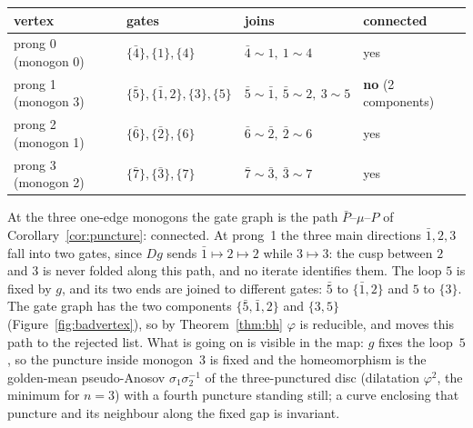 \documentclass[12pt]{amsart}
\newcommand{\anti}[1]{\bar{#1}}          %
\newcommand{\ho}{\varphi}                 %
\newcommand{\Dg}{D}                       %
\newcommand{\per}{P}                      %
\newcommand{\np}{n}                       %
\newcommand{\set}[1]{\{#1\}}
\theoremstyle{plain}
\theoremstyle{definition}
\begin{document}
\begin{center}
  \small
  \begin{tabular}{@{}llll@{}}
    \toprule
    vertex & gates & joins & connected \\
    \midrule
    prong 0 (monogon 0) & $\set{\anti4},\set{1},\set{4}$ & $\anti4\!\sim\!1,\ 1\!\sim\!4$ & yes \\
    prong 1 (monogon 3) & $\set{\anti5},\set{\anti1,2},\set{3},\set{5}$
       & $\anti5\!\sim\!\anti1,\ \anti5\!\sim\!2,\ 3\!\sim\!5$ & \textbf{no} (2 components) \\
    prong 2 (monogon 1) & $\set{\anti6},\set{\anti2},\set{6}$ & $\anti6\!\sim\!\anti2,\ \anti2\!\sim\!6$ & yes \\
    prong 3 (monogon 2) & $\set{\anti7},\set{\anti3},\set{7}$ & $\anti7\!\sim\!\anti3,\ \anti3\!\sim\!7$ & yes \\
    \bottomrule
  \end{tabular}
\end{center}

At the three one-edge monogons the gate graph is the path
$\anti\per$--$\mu$--$\per$ of Corollary~\ref{cor:puncture}: connected.  At
prong~1 the three main directions $\anti1,2,3$ fall into two gates, since
$\Dg g$ sends $\anti1\mapsto2\mapsto2$ while $3\mapsto3$: the cusp
between $2$ and $3$ is never folded along this path, and no iterate
identifies them.  The loop $5$ is fixed by $g$, and its two ends are
joined to different gates: $\anti5$ to $\set{\anti1,2}$ and $5$ to
$\set{3}$.  The gate graph has the two components $\set{\anti5,\anti1,2}$
and $\set{3,5}$ (Figure~\ref{fig:badvertex}), so by Theorem~\ref{thm:bh}
$\ho$ is reducible, and  moves this path to the rejected
list.  What is going on is visible in the map: $g$ fixes the loop~$5$,
so the puncture inside monogon~3 is fixed and the homeomorphism is the
golden-mean pseudo-Anosov $\sigma_1\sigma_2^{-1}$ of the three-punctured
disc (dilatation $\varphi^2$, the minimum for $\np=3$) with a fourth
puncture standing still; a curve enclosing that puncture and its
neighbour along the fixed gap is invariant.
\end{document}
